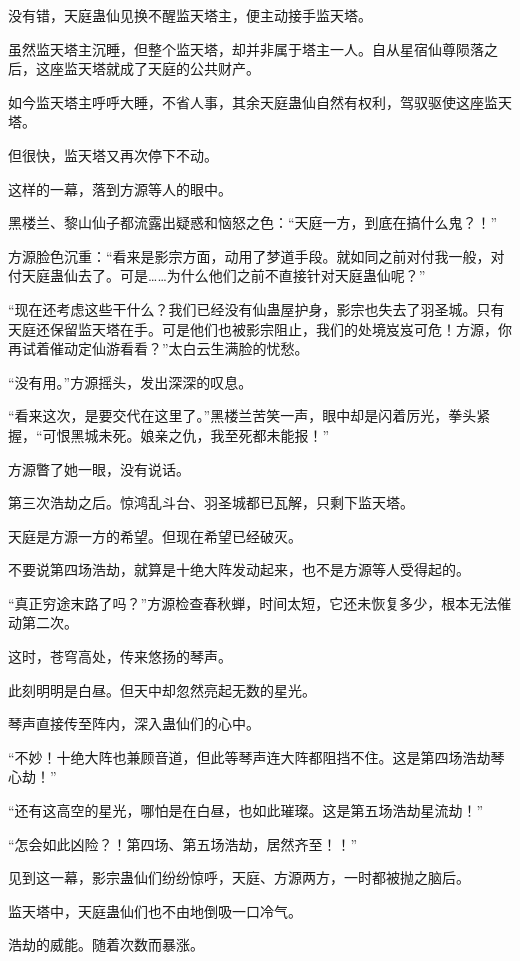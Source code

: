 \begin{this_body}
没有错，天庭蛊仙见换不醒监天塔主，便主动接手监天塔。

虽然监天塔主沉睡，但整个监天塔，却并非属于塔主一人。自从星宿仙尊陨落之后，这座监天塔就成了天庭的公共财产。

如今监天塔主呼呼大睡，不省人事，其余天庭蛊仙自然有权利，驾驭驱使这座监天塔。

但很快，监天塔又再次停下不动。

这样的一幕，落到方源等人的眼中。

黑楼兰、黎山仙子都流露出疑惑和恼怒之色：“天庭一方，到底在搞什么鬼？！”

方源脸色沉重：“看来是影宗方面，动用了梦道手段。就如同之前对付我一般，对付天庭蛊仙去了。可是……为什么他们之前不直接针对天庭蛊仙呢？”

“现在还考虑这些干什么？我们已经没有仙蛊屋护身，影宗也失去了羽圣城。只有天庭还保留监天塔在手。可是他们也被影宗阻止，我们的处境岌岌可危！方源，你再试着催动定仙游看看？”太白云生满脸的忧愁。

“没有用。”方源摇头，发出深深的叹息。

“看来这次，是要交代在这里了。”黑楼兰苦笑一声，眼中却是闪着厉光，拳头紧握，“可恨黑城未死。娘亲之仇，我至死都未能报！”

方源瞥了她一眼，没有说话。

第三次浩劫之后。惊鸿乱斗台、羽圣城都已瓦解，只剩下监天塔。

天庭是方源一方的希望。但现在希望已经破灭。

不要说第四场浩劫，就算是十绝大阵发动起来，也不是方源等人受得起的。

“真正穷途末路了吗？”方源检查春秋蝉，时间太短，它还未恢复多少，根本无法催动第二次。

这时，苍穹高处，传来悠扬的琴声。

此刻明明是白昼。但天中却忽然亮起无数的星光。

琴声直接传至阵内，深入蛊仙们的心中。

“不妙！十绝大阵也兼顾音道，但此等琴声连大阵都阻挡不住。这是第四场浩劫琴心劫！”

“还有这高空的星光，哪怕是在白昼，也如此璀璨。这是第五场浩劫星流劫！”

“怎会如此凶险？！第四场、第五场浩劫，居然齐至！！”

见到这一幕，影宗蛊仙们纷纷惊呼，天庭、方源两方，一时都被抛之脑后。

监天塔中，天庭蛊仙们也不由地倒吸一口冷气。

浩劫的威能。随着次数而暴涨。


\end{this_body}
